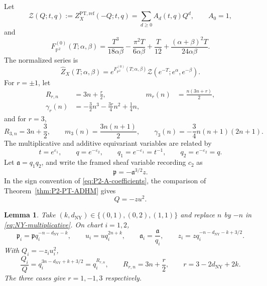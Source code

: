 \documentclass{amsart}
\newtheorem{lemma}{Lemma}
\theoremstyle{definition}
\numberwithin{equation}{section}
\newcommand{\eps}{\varepsilon}
\newcommand{\PT}{\mathrm{PT}}
\begin{document}
Let
\begin{equation}
 \mathcal Z(Q;t,q)
 :=Z_X^{\PT,\mathrm{ref}}(-Q;t,q)
 =\sum_{d\geq0}A_d(t,q)Q^d,
 \qquad A_0=1,
\label{eq:P2-A-coefficients}
\end{equation}
and
\begin{equation}
 F_{\mathbb P^2}^{(0)}(T;\alpha,\beta)
 =\frac{T^3}{18\alpha\beta}
 -\frac{\pi^2T}{6\alpha\beta}+\frac{T}{12}
 +\frac{(\alpha+\beta)^2T}{24\alpha\beta}.
\label{eq:P2-degree-zero-polynomial}
\end{equation}
The normalized series is
\begin{equation}
 \widehat Z_X(T;\alpha,\beta)
 =e^{F_{\mathbb P^2}^{(0)}(T;\alpha,\beta)}
 \mathcal Z(e^{-T};e^\alpha,e^{-\beta}).
\label{eq:HSW-full-partition}
\end{equation}
For \(r=\pm1\), let
\begin{equation}
\begin{aligned}
 R_{r,n}&=3n+\frac r2,&
 m_r(n)&=\frac{n(3n+r)}2,\\
 \gamma_r(n)&=-\frac32n^3-\frac{3r}{4}n^2+\frac14n,
\end{aligned}
\label{eq:P2-unity-exponents}
\end{equation}
and for \(r=3\),
\begin{equation}
 R_{3,n}=3n+\frac32,\qquad
 m_3(n)=\frac{3n(n+1)}2,\qquad
 \gamma_3(n)=-\frac34n(n+1)(2n+1).
\label{eq:P2-vanishing-exponents}
\end{equation}
The multiplicative and additive equivariant variables are related by
\begin{equation}
 t=e^{\eps_1},\qquad q=e^{-\eps_2},\qquad
 q_1=e^{-\eps_1}=t^{-1},\qquad q_2=e^{-\eps_2}=q.
\label{eq:P2-blowup-variable-change}
\end{equation}
Let \(\mathfrak a=q_1q_2\), and write the framed sheaf variable recording \(c_2\) as
\begin{equation}
 \mathfrak p=-\mathfrak a^{3/2}z.
\label{eq:NY-z-variable}
\end{equation}
In the sign convention of \eqref{eq:P2-A-coefficients}, the comparison of Theorem~\ref{thm:P2-PT-ADHM} gives
\begin{equation}
 Q=-zu^2.
\label{eq:P2-plane-variable}
\end{equation}

\begin{lemma}
\label{lem:NY-chart-substitutions}
Take \((k,d_{\mathrm{NY}})\in\{(0,1),(0,2),(1,1)\}\) and replace \(n\) by \(-n\) in \eqref{eq:NY-multiplicative}.  On chart \(i=1,2\),
\begin{equation}
 \mathfrak p_i=\mathfrak p q_i^{-n-d_{\mathrm{NY}}-k},\qquad
 u_i=uq_i^{2n+k},\qquad
 \mathfrak a_i=\frac{\mathfrak a}{q_i},\qquad
 z_i=zq_i^{-n-d_{\mathrm{NY}}-k+3/2}.
\label{eq:NY-chart-substitutions}
\end{equation}
With \(Q_i=-z_i u_i^2\),
\begin{equation}
 \frac{Q_i}{Q}
 =q_i^{3n-d_{\mathrm{NY}}+k+3/2}
 =q_i^{R_{r,n}},
 \qquad
 R_{r,n}=3n+\frac r2,\qquad r=3-2d_{\mathrm{NY}}+2k.
\label{eq:NY-plane-shift}
\end{equation}
The three cases give \(r=1,-1,3\) respectively.
\end{lemma}
\end{document}
